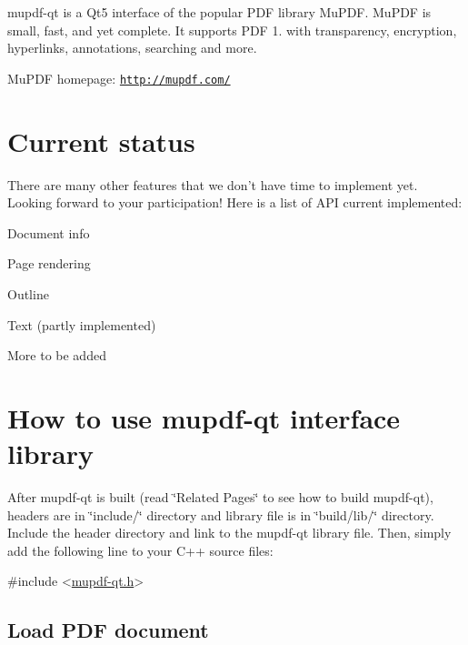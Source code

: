 mupdf-\/qt is a Qt5 interface of the popular P\-D\-F library Mu\-P\-D\-F. Mu\-P\-D\-F is small, fast, and yet complete. It supports P\-D\-F 1. with transparency, encryption, hyperlinks, annotations, searching and more.

Mu\-P\-D\-F homepage\-: \href{http://mupdf.com/}{\tt http\-://mupdf.\-com/}\hypertarget{index_status}{}\section{Current status}\label{index_status}
There are many other features that we don't have time to implement yet. Looking forward to your participation! Here is a list of A\-P\-I current implemented\-:
\begin{DoxyItemize}
\item Document info
\item Page rendering
\item Outline
\item Text (partly implemented)
\item More to be added
\end{DoxyItemize}\hypertarget{index_usage}{}\section{How to use mupdf-\/qt interface library}\label{index_usage}
After mupdf-\/qt is built (read \char`\"{}\-Related Pages\char`\"{} to see how to build mupdf-\/qt), headers are in \char`\"{}include/\char`\"{} directory and library file is in \char`\"{}build/lib/\char`\"{} directory. Include the header directory and link to the mupdf-\/qt library file. Then, simply add the following line to your C++ source files\-:


\begin{DoxyCode}
\textcolor{preprocessor}{#include <\hyperlink{mupdf-qt_8h}{mupdf-qt.h}>}
\end{DoxyCode}
\hypertarget{index_document}{}\subsection{Load P\-D\-F document}\label{index_document}

